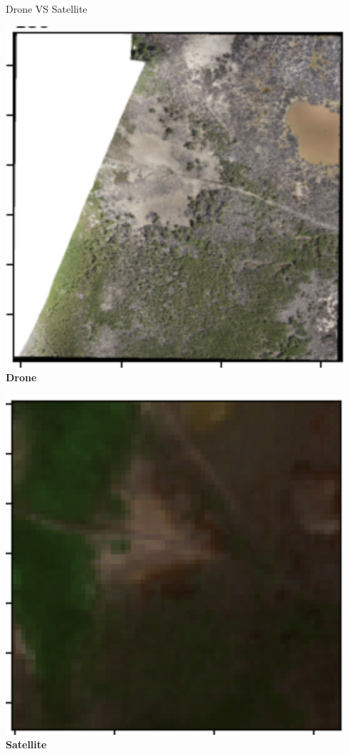 \begin{frame}{Drone VS Satellite}
  \centering
  \begin{minipage}{0.48\textwidth}
    \centering
    \includegraphics[width=\textwidth,keepaspectratio]{images/chunk-tif}
    \textbf{Drone}
  \end{minipage}
  \hfill
  \begin{minipage}{0.48\textwidth}
    \centering
    \includegraphics[width=\textwidth,keepaspectratio]{images/satellite-tif}
    \textbf{Satellite}
  \end{minipage}
\end{frame}

